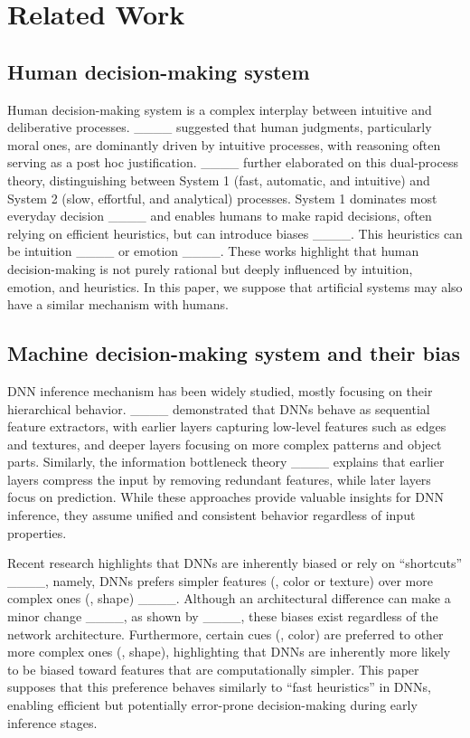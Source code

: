 \section{Related Work}
\subsection{Human decision-making system}

Human decision-making system is a complex interplay between intuitive and deliberative processes. ____ suggested that human judgments, particularly moral ones, are dominantly driven by intuitive processes, with reasoning often serving as a post hoc justification. ____ further elaborated on this dual-process theory, distinguishing between System 1 (fast, automatic, and intuitive) and System 2 (slow, effortful, and analytical) processes. System 1 dominates most everyday decision ____ and enables humans to make rapid decisions, often relying on efficient heuristics, but can introduce biases ____. This heuristics can be intuition ____ or emotion ____.
These works highlight that human decision-making is not purely rational but deeply influenced by intuition, emotion, and heuristics.
In this paper, we suppose that artificial systems may also have a similar mechanism with humans.

\subsection{Machine decision-making system and their bias}

DNN inference mechanism has been widely studied, mostly focusing on their hierarchical behavior. ____ demonstrated that DNNs behave as sequential feature extractors, with earlier layers capturing low-level features such as edges and textures, and deeper layers focusing on more complex patterns and object parts. Similarly, the information bottleneck theory ____ explains that earlier layers compress the input by removing redundant features, while later layers focus on prediction. While these approaches provide valuable insights for DNN inference, they assume unified and consistent behavior regardless of input properties.

Recent research highlights that DNNs are inherently biased or rely on ``shortcuts'' ____, namely, DNNs prefers simpler features (\eg, color or texture) over more complex ones (\eg, shape) ____.
Although an architectural difference can make a minor change ____, as shown by ____, these biases exist regardless of the network architecture. Furthermore, certain cues (\eg, color) are preferred to other more complex ones (\eg, shape), highlighting that DNNs are inherently more likely to be biased toward features that are computationally simpler.
This paper supposes that this preference behaves similarly to ``fast heuristics'' in DNNs, enabling efficient but potentially error-prone decision-making during early inference stages.